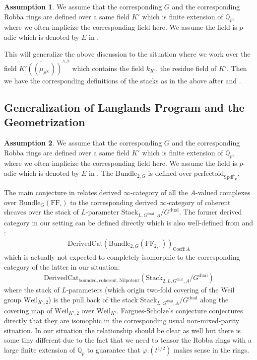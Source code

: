 \documentclass[12pt]{book}
\theoremstyle{definition}
\newtheorem{assumption}{Assumption}
\begin{document}
\begin{assumption}
We assume that the corresponding $G$ and the corresponding Robba rings are defined over a same field $K'$ which is finite extension of $\mathbb{Q}_p$, where we often implicize the corresponding field here. We assume the field is $p$-adic which is denoted by $E$ in \cite{LPFS}.
\end{assumption}

\noindent This will generalize the above discussion to the situation where we work over the field $\overline{K'((\mu_{p^\infty}))}^{\wedge,\flat}$ which contains the field $k_{K'}$, the residue field of $K'$. Then we have the corresponding definitions of the stacks as in the above after \cite{pHodgeKL2} and \cite{LPFS}.



\newpage
\subsection{Generalization of Langlands Program and the Geometrization}

\begin{assumption}
We assume that the corresponding $G$ and the corresponding Robba rings are defined over a same field $K'$ which is finite extension of $\mathbb{Q}_p$, where we often implicize the corresponding field here. We assume the field is $p$-adic which is denoted by $E$ in \cite{LPFS}. The $\mathrm{Bundle}_{2,G}$ is defined over $\mathrm{perfectoid}_{\mathrm{Spd}\overline{\mathbb{F}}_p}$. 
\end{assumption}

\indent  The main conjecture in \cite{LPFS} relates derived $\infty$-category of all the $A$-valued complexes over $\mathrm{Bundle}_G(\mathrm{FF}_{\square})$ to the corresponding derived $\infty$-category of coherent sheaves over the stack of $L$-parameter $\mathrm{Stack}_{L,{G}^\mathrm{dual},A}/{G}^\mathrm{dual}$. The former derived category in our setting can be defined directly which is also well-defined from \cite{LPFS} and \cite{pHodgeS2}:
\begin{align}
\mathrm{DerivedCat}(\mathrm{Bundle}_{2,G}(\mathrm{FF}_{2,\square}))_{\mathrm{Coeff}: A}
\end{align}
which is actually not expected to completely isomorphic to the corresponding category of the latter in our situation:
\begin{align}
\mathrm{DerivedCat}_{\mathrm{bounded},\mathrm{coherent},\mathrm{Nilpotent}}(\mathrm{Stack}_{2,L,{G}^\mathrm{dual},A}/{G}^\mathrm{dual})
\end{align}
where the stack of $L$-parameters (which origin two-fold covering of the Weil group $\mathrm{Weil}_{K',2}$) is the pull back of the stack $\mathrm{Stack}_{L,{G}^\mathrm{dual},A}/{G}^\mathrm{dual}$ along the covering map of $\mathrm{Weil}_{K',2}$ over $\mathrm{Weil}_{K'}$. Fargues-Scholze's conjecture conjectures directly that they are isomophic in the corresponding usual non-mixed-parity situation. In our situation the relationship should be clear as well but there is some tiny different due to the fact that we need to tensor the Robba rings with a large finite extension of $\mathbb{Q}_p$ to guarantee that $\varphi.(t^{1/2})$ makes sense in the rings.
\end{document}
